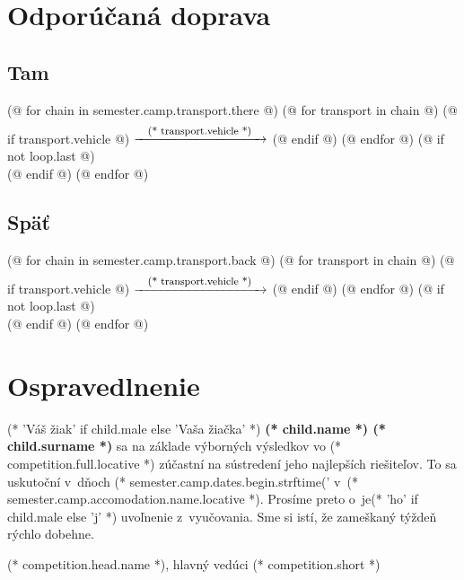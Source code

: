 \documentclass[12pt, twoside]{article}
\begin{document}
    \clearpage

    \section{Odporúčaná doprava}
        \subsection{Tam}
        (@ for chain in semester.camp.transport.there @)
            (@ for transport in chain @)
                (@ if transport.vehicle @) $\xrightarrow{\raisebox{-4mm}{\footnotesize\text{\quad (* transport.vehicle *)\quad}}}$ (@ endif @)
            (@ endfor @)%
            (@ if not loop.last @)\\(@ endif @)%
        (@ endfor @)
        \subsection{Späť}
        (@ for chain in semester.camp.transport.back @)
            (@ for transport in chain @)
                (@ if transport.vehicle @) $\xrightarrow{\raisebox{-4mm}{\footnotesize\text{\quad (* transport.vehicle *)\quad}}}$ (@ endif @)
            (@ endfor @)%
            (@ if not loop.last @)\\(@ endif @)%
        (@ endfor @)

    \cutHere

    \section{Ospravedlnenie}
        (* 'Váš žiak' if child.male else 'Vaša žiačka' *) \textbf{(* child.name *) (* child.surname *)} sa na základe výborných výsledkov vo (* competition.full.locative *)
        zúčastní na sústredení jeho najlepších riešiteľov. To sa uskutoční v~dňoch (* semester.camp.dates.begin.strftime('%
        v~(* semester.camp.accomodation.name.locative *). Prosíme preto o~je(* 'ho' if child.male else 'j' *) uvoľnenie z~vyučovania.
        Sme si istí, že zameškaný týždeň rýchlo dobehne.
        \vspace{5mm}

        \hfill (* competition.head.name *), hlavný vedúci (* competition.short *)
    
\end{document}
